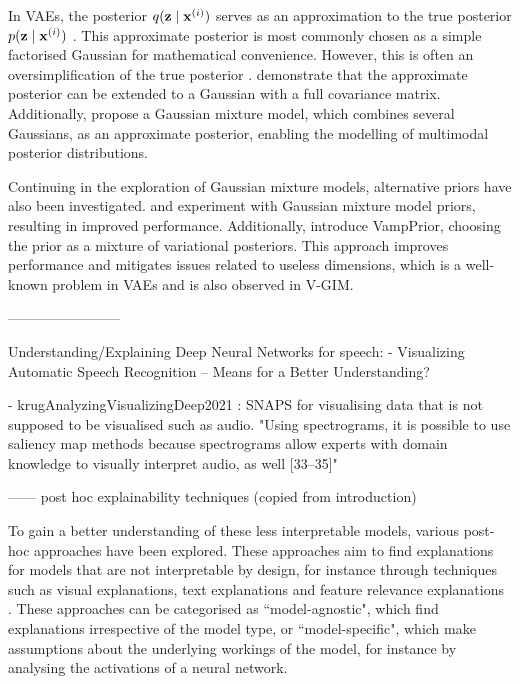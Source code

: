 	In VAEs, the posterior $q (\mathbf{z} \mid \mathbf{x}^{(i)})$ serves as an approximation to the true posterior $p (\mathbf{z} \mid \mathbf{x}^{(i)})$ \citep{odaiboTutorialDerivingStandard2019}. This approximate posterior is most commonly chosen as a simple factorised Gaussian for mathematical convenience. However, this is often an oversimplification of the true posterior \citep{nalisnickApproximateInferenceDeep2016a}. \cite{kingmaIntroductionVariationalAutoencoders2019} demonstrate that the approximate posterior can be extended to a Gaussian with a full covariance matrix. Additionally, \cite{nalisnickApproximateInferenceDeep2016a} propose a Gaussian mixture model, which combines several Gaussians, as an approximate posterior, enabling the modelling of multimodal posterior distributions.
	
	Continuing in the exploration of Gaussian mixture models, alternative priors have also been investigated. \cite{guoVariationalAutoencoderOptimizing2020} and \cite{leeMetaGMVAEMixtureGaussian2021} experiment with Gaussian mixture model priors, resulting in improved performance. Additionally, \cite{tomczakVAEVampPrior2018} introduce VampPrior, choosing the prior as a mixture of variational posteriors. This approach improves performance and mitigates issues related to useless dimensions, which is a well-known problem in VAEs and is also observed in V-GIM.
	

------------------------

Understanding/Explaining Deep Neural Networks for speech:
- Visualizing Automatic Speech Recognition – Means for a Better Understanding? \citep{markertVisualizingAutomaticSpeech2021} %

- krugAnalyzingVisualizingDeep2021 : SNAPS for visualising data that is not supposed to be visualised such as audio.
	"Using spectrograms, it is possible to use saliency map methods because spectrograms allow experts with domain knowledge to visually interpret audio, as well [33–35]" %


------ post hoc explainability techniques (copied from introduction)

To gain a better understanding of these less interpretable models, various post-hoc approaches have been explored. These approaches aim to find explanations for models that are not interpretable by design, for instance through techniques such as visual explanations, text explanations and feature relevance explanations \citep{barredoarrietaExplainableArtificialIntelligence2020a}. These approaches can be categorised as ``model-agnostic", which find explanations irrespective of the model type, or ``model-specific", which make assumptions about the underlying workings of the model, for instance by analysing the activations of a neural network.

